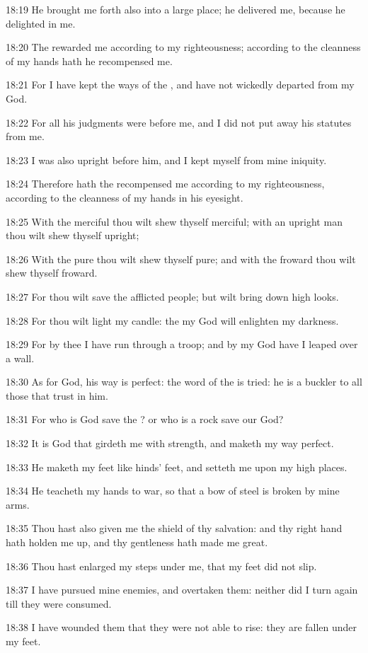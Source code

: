 18:19 He brought me forth also into a large place; he delivered me,
because he delighted in me.

18:20 The \LORD rewarded me according to my righteousness; according to
the cleanness of my hands hath he recompensed me.

18:21 For I have kept the ways of the \LORD, and have not wickedly
departed from my God.

18:22 For all his judgments were before me, and I did not put away his
statutes from me.

18:23 I was also upright before him, and I kept myself from mine
iniquity.

18:24 Therefore hath the \LORD recompensed me according to my
righteousness, according to the cleanness of my hands in his eyesight.

18:25 With the merciful thou wilt shew thyself merciful; with an
upright man thou wilt shew thyself upright;

18:26 With the pure thou wilt shew thyself pure; and with the froward
thou wilt shew thyself froward.

18:27 For thou wilt save the afflicted people; but wilt bring down
high looks.

18:28 For thou wilt light my candle: the \LORD my God will enlighten my
darkness.

18:29 For by thee I have run through a troop; and by my God have I
leaped over a wall.

18:30 As for God, his way is perfect: the word of the \LORD is tried:
he is a buckler to all those that trust in him.

18:31 For who is God save the \LORD? or who is a rock save our God?

18:32 It is God that girdeth me with strength, and maketh my way
perfect.

18:33 He maketh my feet like hinds' feet, and setteth me upon my high
places.

18:34 He teacheth my hands to war, so that a bow of steel is broken by
mine arms.

18:35 Thou hast also given me the shield of thy salvation: and thy
right hand hath holden me up, and thy gentleness hath made me great.

18:36 Thou hast enlarged my steps under me, that my feet did not slip.

18:37 I have pursued mine enemies, and overtaken them: neither did I
turn again till they were consumed.

18:38 I have wounded them that they were not able to rise: they are
fallen under my feet.

